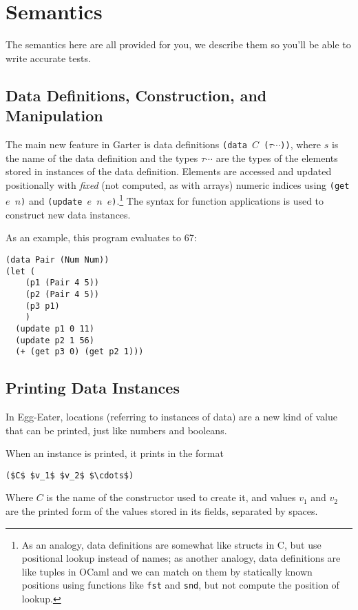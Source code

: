 \documentclass[10pt, oneside]{article}
\begin{document}
\section*{Semantics}

The semantics here are all provided for you, we describe them so you'll be
able to write accurate tests.

\subsection*{Data Definitions, Construction, and Manipulation}

The main new feature in Garter is data definitions \texttt{(data $C$
($\tau \cdots$))}, where $s$ is the name of the data definition and the types
$\tau \cdots$ are the types of the elements stored in instances of the data
definition. Elements are accessed and updated positionally with \emph{fixed}
(not computed, as with arrays) numeric indices using \texttt{(get $e$ $n$)}
and \texttt{(update $e$ $n$ $e$)}.\footnote{As an analogy, data definitions
are somewhat like structs in C, but use positional lookup instead of names;
as another analogy, data definitions are like tuples in OCaml and we can
match on them by statically known positions using functions like {\tt fst}
and {\tt snd}, but not compute the position of lookup.} The syntax for
function applications is used to construct new data instances.

As an example, this program evaluates to 67:

\begin{lstlisting}
(data Pair (Num Num))
(let (
    (p1 (Pair 4 5))
    (p2 (Pair 4 5))
    (p3 p1)
    )
  (update p1 0 11)
  (update p2 1 56)
  (+ (get p3 0) (get p2 1)))
\end{lstlisting}

\subsection*{Printing Data Instances}

In Egg-Eater, locations (referring to instances of data) are a new kind of
value that can be printed, just like numbers and booleans.

When an instance is printed, it prints in the format

\begin{lstlisting}
($C$ $v_1$ $v_2$ $\cdots$)
\end{lstlisting}

Where $C$ is the name of the constructor used to create it, and values $v_1$
and $v_2$ are the printed form of the values stored in its fields, separated
by spaces.
\end{document}
